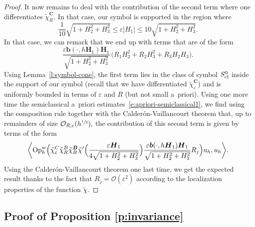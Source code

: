 \documentclass[JEP,XML,SOM,Unicode, NoEqCountersInSection,published]{cedram}
\theoremstyle{plain}
\theoremstyle{definition}
\theoremstyle{remark}
\newcommand{\Op}{\operatorname{Op}}
\begin{document}
\begin{proof}
It now remains to deal with the contribution of the second term where one differentiates $\tilde{\chi}_R^{\boldsymbol{C}}$. In that case, our symbol is supported in the region where
\[
\frac{1}{10}\sqrt{1+H_2^2+H_3^2}\leq \varepsilon|H_1|\leq 10\sqrt{1+H_2^2+H_3^2}.
\]
In that case, we can remark that we end up with terms that are of the form
\[
\frac{\varepsilon \boldsymbol{b}(\cdot,h\boldsymbol{H}_1)\boldsymbol{H}_1}{\sqrt{1+H_2^2+H_3^2}}\,\bigl(R_1H_2^2+R_2H_3^2+R_3H_2H_3\bigr).
\]
Using Lemma~\ref{l:symbol-cone}, the first term lies in the class of symbol $S^0_{\textup{cl}}$ inside the support of our symbol (recall that we have differentiated $\tilde{\chi}_{\varepsilon}^{\boldsymbol{C}}$) and is uniformly bounded in terms of $\varepsilon$ and $R$ (but not small a~priori). Using one more time the semiclassical a~priori estimates~\eqref{e:apriori-semiclassical1}, we find using the composition rule together with the Calderón-Vaillancourt theorem that, up to remainders of size $\mathcal{O}_{R,\varepsilon}(h^{\sfrac{1}{2}}),$ the contribution of this second term is given by terms of the form
\[
\biggl\langle\Op_h^w\Bigl(\tilde{\chi}_\varepsilon^C\tilde{\chi}_R^B\tilde{\chi}_R^{\boldsymbol{B}}\tilde{\chi}'\Bigl(\frac{\varepsilon\boldsymbol{H}_1}{4\sqrt{1+H_2^2+H_3^2}}\Bigr)\frac{\varepsilon \boldsymbol{b}(\cdot,h\boldsymbol{H}_1)\boldsymbol{H}_1}{\sqrt{1+H_2^2+H_3^2}}R_j\Bigr)u_h,u_h\biggr\rangle.
\]
Using the Calderón-Vaillancourt theorem one last time, we get the expected result thanks to the fact that $R_j=\mathcal{O}(\varepsilon^2)$ according to the localization properties of the function $\tilde{\chi}$.
\end{proof}

\subsection{Proof of Proposition \ref{p:invariance}}
\end{document}
